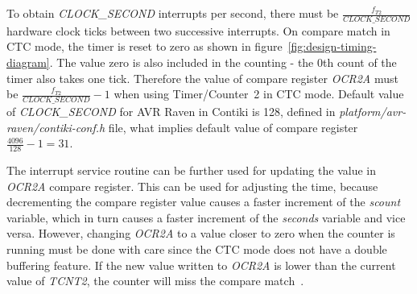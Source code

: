 To obtain {\it{CLOCK\_SECOND}} interrupts per second, there must be
${\frac{f_{T2}}{CLOCK\_SECOND}}$ hardware clock ticks between two successive interrupts.
On compare match in CTC mode, the timer is reset to zero as
shown in figure~\ref{fig:design-timing-diagram}.
The value zero is also included in the counting - the 0th count of the timer also takes one tick.
Therefore the value of compare register {\it{OCR2A}} must be ${\frac{f_{T2}}{CLOCK\_SECOND}} - 1$
when using Timer/Counter~2 in CTC mode.
Default value of {\it{CLOCK\_SECOND}} for AVR Raven in Contiki is 128,
defined in {\it{platform/avr-raven/contiki-conf.h}} file,
what implies default value of compare register ${\frac{4096}{128}} - 1 = 31$.

The interrupt service routine can be further used for updating the value in {\it{OCR2A}} compare register.
This can be used for adjusting the time, because decrementing the compare register
value causes a faster increment of the {\it{scount}} variable, which in turn causes
a faster increment of the {\it{seconds}} variable and vice versa.
However, changing {\it{OCR2A}} to a value closer to zero when the counter is running
must be done with care since the CTC mode does not have a double buffering feature.
If the new value written to {\it{OCR2A}} is lower than the current
value of {\it{TCNT2}}, the counter will miss the compare match~\cite{avr-datasheet}.
